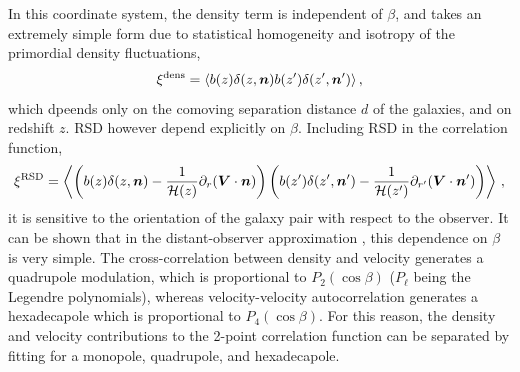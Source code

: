 In this coordinate system, the density term is independent of $\beta$, and takes an extremely simple form due to statistical homogeneity and isotropy of the primordial density fluctuations, 
\begin{equation}
	\xi^\mathrm{dens} = \langle b(z) \delta(z,\bm {n}) b(z') \delta(z', \bm {n}') \rangle\,,
\end{equation}
which dpeends only on the comoving separation distance $d$ of the galaxies, and on redshift $z$. 
RSD however depend explicitly on $\beta$. Including RSD in the correlation function, 
\begin{equation}
	\xi^\mathrm{RSD} = \left\langle \left( b(z) \delta(z,\bm {n}) - \frac{1}{\mathcal{H}(z)} \partial_r (\bm{V} \cdot \bm {n}) \right) \left( b(z') \delta(z', \bm {n}') - \frac{1}{\mathcal{H}(z')} \partial_{r'} (\bm{V} \cdot \bm {n}') \right) \right\rangle\,,
\end{equation}
it is sensitive to the orientation of the galaxy pair with respect to the observer. It can be shown that in the distant-observer approximation , this dependence on $\beta$ is very simple. The cross-correlation between density and velocity generates a quadrupole modulation, which is proportional to $P_2(\cos\beta)$ ($P_\ell$ being the Legendre polynomials), whereas velocity-velocity autocorrelation generates a hexadecapole which is proportional to $P_4(\cos\beta)$. For this reason, the density and velocity contributions to the 2-point correlation function can be separated by fitting for a monopole, quadrupole, and hexadecapole. 


